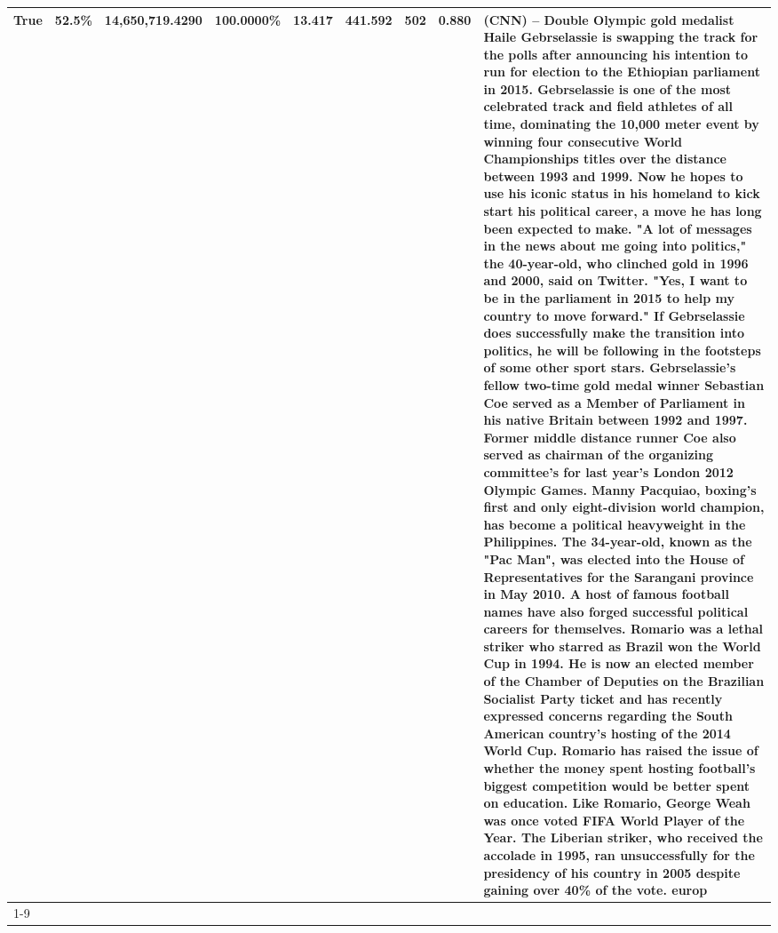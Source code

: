 \begin{table}[H]
{\begin{tabular}{lllrlllll}
True & 52.5\% & 14,650,719.4290 & \bfseries \color{red} 100.0000\% & 13.417 & 441.592 & 502 & 0.880 & (CNN) -- Double Olympic gold medalist Haile Gebrselassie is swapping the track for the polls after announcing his intention to run for election to the Ethiopian parliament in 2015. Gebrselassie is one of the most celebrated track and field athletes of all time, dominating the 10,000 meter event by winning four consecutive World Championships titles over the distance between 1993 and 1999. Now he hopes to use his iconic status in his homeland to kick start his political career, a move he has long been expected to make. "A lot of messages in the news about me going into politics," the 40-year-old, who clinched gold in 1996 and 2000, said on Twitter. "Yes, I want to be in the parliament in 2015 to help my country to move forward." If Gebrselassie does successfully make the transition into politics, he will be following in the footsteps of some other sport stars. Gebrselassie's fellow two-time gold medal winner Sebastian Coe served as a Member of Parliament in his native Britain between 1992 and 1997. Former middle distance runner Coe also served as chairman of the organizing committee's for last year's London 2012 Olympic Games. Manny Pacquiao, boxing's first and only eight-division world champion, has become a political heavyweight in the Philippines. The 34-year-old, known as the "Pac Man", was elected into the House of Representatives for the Sarangani province in May 2010. A host of famous football names have also forged successful political careers for themselves. Romario was a lethal striker who starred as Brazil won the World Cup in 1994. He is now an elected member of the Chamber of Deputies on the Brazilian Socialist Party ticket and has recently expressed concerns regarding the South American country's hosting of the 2014 World Cup. Romario has raised the issue of whether the money spent hosting football's biggest competition would be better spent on education. Like Romario, George Weah was once voted FIFA World Player of the Year. The Liberian striker, who received the accolade in 1995, ran unsuccessfully for the presidency of his country in 2005 despite gaining over 40\% of the vote. europ \\
\cline{1-9}

\end{tabular}}
\end{table}
